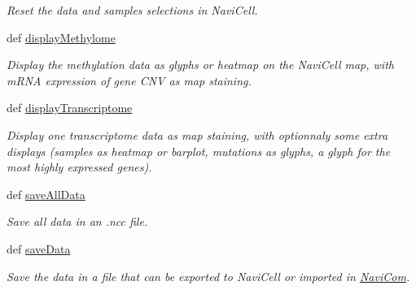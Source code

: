 \begin{DoxyCompactItemize}
\begin{DoxyCompactList}\small\item\em Reset the data and samples selections in NaviCell. \item\end{DoxyCompactList}\item 
def \hyperlink{classnavicom_1_1navicom_1_1NaviCom_a018f936de625af8a5dd7e8250ede6483}{displayMethylome}
\begin{DoxyCompactList}\small\item\em Display the methylation data as glyphs or heatmap on the NaviCell map, with mRNA expression of gene CNV as map staining. \item\end{DoxyCompactList}\item 
def \hyperlink{classnavicom_1_1navicom_1_1NaviCom_a001dadf6f3dc0c77ba5b14da621b110d}{displayTranscriptome}
\begin{DoxyCompactList}\small\item\em Display one transcriptome data as map staining, with optionnaly some extra displays (samples as heatmap or barplot, mutations as glyphs, a glyph for the most highly expressed genes). \item\end{DoxyCompactList}\item 
def \hyperlink{classnavicom_1_1navicom_1_1NaviCom_ab539e16bff0a424ebd2753c153ff4e53}{saveAllData}
\begin{DoxyCompactList}\small\item\em Save all data in an .ncc file. \item\end{DoxyCompactList}\item 
\hypertarget{classnavicom_1_1navicom_1_1NaviCom_ac53d9dc53ca0af44586a55fb1bffe8bd}{
def \hyperlink{classnavicom_1_1navicom_1_1NaviCom_ac53d9dc53ca0af44586a55fb1bffe8bd}{saveData}}
\label{classnavicom_1_1navicom_1_1NaviCom_ac53d9dc53ca0af44586a55fb1bffe8bd}

\begin{DoxyCompactList}\small\item\em Save the data in a file that can be exported to NaviCell or imported in \hyperlink{classnavicom_1_1navicom_1_1NaviCom}{NaviCom}. \item\end{DoxyCompactList}\end{DoxyCompactItemize}
